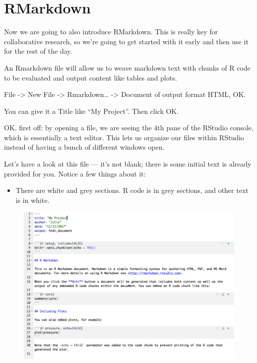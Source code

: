 \documentclass[]{book}
\providecommand{\tightlist}{%
  \setlength{\itemsep}{0pt}\setlength{\parskip}{0pt}}
\theoremstyle{definition}
\theoremstyle{definition}
\theoremstyle{definition}
\theoremstyle{remark}
\begin{document}
\section{RMarkdown}\label{rmarkdown}

Now we are going to also introduce RMarkdown. This is really key for
collaborative research, so we're going to get started with it early and
then use it for the rest of the day.

An Rmarkdown file will allow us to weave markdown text with chunks of R
code to be evaluated and output content like tables and plots.

File -\textgreater{} New File -\textgreater{} Rmarkdown\ldots{}
-\textgreater{} Document of output format HTML, OK.

You can give it a Title like ``My Project''. Then click OK.

OK, first off: by opening a file, we are seeing the 4th pane of the
RStudio console, which is essentially a text editor. This lets us
organize our files within RStudio instead of having a bunch of different
windows open.

Let's have a look at this file --- it's not blank; there is some initial
text is already provided for you. Notice a few things about it:

\begin{itemize}
\tightlist
\item
  There are white and grey sections. R code is in grey sections, and
  other text is in white.
\end{itemize}

\begin{figure}[htbp]
\centering
\includegraphics{img/rmarkdown.png}
\caption{}
\end{figure}
\end{document}
